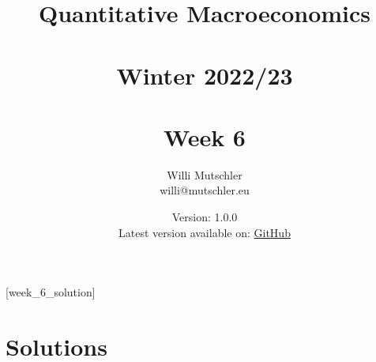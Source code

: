 
\newif\ifDisplaySolutions\DisplaySolutionstrue


\title{Quantitative Macroeconomics\\~\\Winter 2022/23\\~\\Week 6}
\author{Willi Mutschler\\willi@mutschler.eu}
\date{Version: 1.0.0\\Latest version available on: \href{https://github.com/wmutschl/Quantitative-Macroeconomics/releases/latest/download/week_6.pdf}{GitHub}}
\maketitle\thispagestyle{empty}

\newpage
{}[week_6_solution]
\tableofcontents\thispagestyle{empty}\newpage

\setcounter{page}{1}
\newpage
\newpage
\newpage
\printbibliography
\newpage

\ifDisplaySolutions
\newpage
\appendix
\section{Solutions}

\fi
